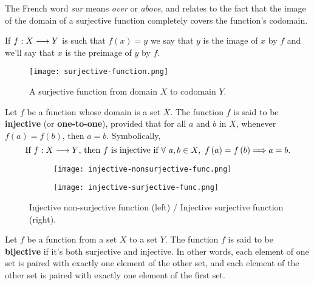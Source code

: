 \begin{note}
    The French word \textit{sur} means \textit{over} or \textit{above}, and relates to the fact that the image of the domain of a surjective function completely covers the function's codomain.
\end{note}

\begin{notation}
    If $f : X\longrightarrow Y$ is such that $f\left( x \right) = y$ we say that $y$ is the image of $x$ by $f$ and we'll say that $x$ is the preimage of $y$ by $f$.
\end{notation}

\begin{figure}[htbp]
    \centerline{\texttt{[image: surjective-function.png]}}
    \caption{A surjective function from domain $X$ to codomain $Y$.}
\end{figure}

\begin{defi}
    Let $f$ be a function whose domain is a set $X$. The function $f$ is said to be \textbf{injective} (or \textbf{one-to-one}), provided that for all $a$ and $b$ in $X$, whenever $f\left( a \right) = f\left( b \right)$, then $a = b$. Symbolically,
    \begin{equation}
        \textrm{If } \appl{f}{X}{Y}\textrm{, then $f$ is injective if }\forall\ a, b\in X,\ f\left( a \right) = f\left( b \right) \implies a = b.
    \end{equation}
\end{defi}

\begin{figure}[htbp]
    \centering
    \begin{subfigure}{.25\textwidth}
        \texttt{[image: injective-nonsurjective-func.png]}
    \end{subfigure}
    \hspace{1cm}
    \begin{subfigure}{.25\textwidth}
        \texttt{[image: injective-surjective-func.png]}
    \end{subfigure}
    \caption{Injective non-surjective function (left) / Injective surjective function (right).}
\end{figure}

\begin{defi}
    Let $f$ be a function from a set $X$ to a set $Y$. The function $f$ is said to be \textbf{bijective} if it's both surjective and injective. In other words, each element of one set is paired with exactly one element of the other set, and each element of the other set is paired with exactly one element of the first set.
\end{defi}

